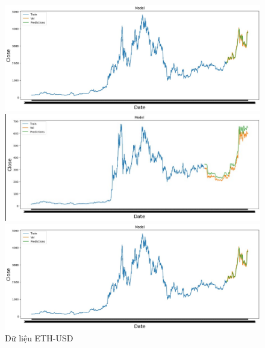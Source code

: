 \documentclass[conference]{IEEEtran}
\begin{document}
	\begin{figure}[H]
		\centering
		\begin{minipage}{0.15\textwidth}
			\centering
			\includegraphics[width=1\textwidth]{Figure/ETH_LSTM.jpg}
		\end{minipage}
		\hfill
		\begin{minipage}{0.15\textwidth}
			\centering
			\includegraphics[width=1\textwidth]{Figure/LSTM_I.jpg}
		\end{minipage}
		\hfill
		\begin{minipage}{0.15\textwidth}
			\centering
			\includegraphics[width=1\textwidth]{Figure/ETH_LSTM.jpg}
		\end{minipage}
		\caption{Dữ liệu ETH-USD}
		\label{fig:1}
	\end{figure}
	
\end{document}
